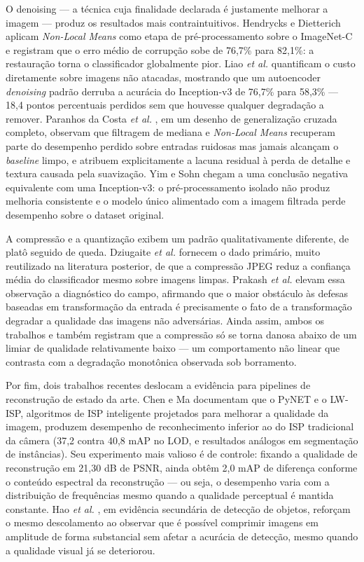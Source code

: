 \documentclass[conference]{IEEEtran}
\begin{document}
O denoising --- a técnica cuja finalidade declarada é justamente melhorar a
imagem --- produz os resultados mais contraintuitivos. Hendrycks e Dietterich
\cite{b6} aplicam \textit{Non-Local Means} como etapa de pré-processamento
sobre o ImageNet-C e registram que o erro médio de corrupção sobe de 76,7\%
para 82,1\%: a restauração torna o classificador globalmente pior. Liao
\textit{et al.} \cite{b7} quantificam o custo diretamente sobre imagens não
atacadas, mostrando que um autoencoder \textit{denoising} padrão derruba a
acurácia do Inception-v3 de 76,7\% para 58,3\% --- 18,4 pontos percentuais
perdidos sem que houvesse qualquer degradação a remover. Paranhos da Costa
\textit{et al.} \cite{b8}, em um desenho de generalização cruzada completo,
observam que filtragem de mediana e \textit{Non-Local Means} recuperam parte do
desempenho perdido sobre entradas ruidosas mas jamais alcançam o \textit{baseline}
limpo, e atribuem explicitamente a lacuna residual à perda de detalhe e textura
causada pela suavização. Yim e Sohn \cite{b9} chegam a uma conclusão negativa
equivalente com uma Inception-v3: o pré-processamento isolado não produz
melhoria consistente e o modelo único alimentado com a imagem filtrada perde
desempenho sobre o dataset original.

A compressão e a quantização exibem um padrão qualitativamente diferente, de
platô seguido de queda. Dziugaite \textit{et al.} \cite{b10} fornecem o dado
primário, muito reutilizado na literatura posterior, de que a compressão JPEG
reduz a confiança média do classificador mesmo sobre imagens limpas. Prakash
\textit{et al.} \cite{b11} elevam essa observação a diagnóstico do campo,
afirmando que o maior obstáculo às defesas baseadas em transformação da entrada
é precisamente o fato de a transformação degradar a qualidade das imagens não
adversárias. Ainda assim, ambos os trabalhos e também \cite{b1} registram que a
compressão só se torna danosa abaixo de um limiar de qualidade relativamente
baixo --- um comportamento não linear que contrasta com a degradação monotônica
observada sob borramento.

Por fim, dois trabalhos recentes deslocam a evidência para pipelines de
reconstrução de estado da arte. Chen e Ma \cite{b12} documentam que o PyNET e o
LW-ISP, algoritmos de ISP inteligente projetados para melhorar a qualidade da
imagem, produzem desempenho de reconhecimento inferior ao do ISP tradicional da
câmera (37,2 contra 40,8 mAP no LOD, e resultados análogos em segmentação de
instâncias). Seu experimento mais valioso é de controle: fixando a qualidade de
reconstrução em 21,30 dB de PSNR, ainda obtêm 2,0 mAP de diferença conforme o
conteúdo espectral da reconstrução --- ou seja, o desempenho varia com a
distribuição de frequências mesmo quando a qualidade perceptual é mantida
constante. Hao \textit{et al.} \cite{b13}, em evidência secundária de detecção
de objetos, reforçam o mesmo descolamento ao observar que é possível comprimir
imagens em amplitude de forma substancial sem afetar a acurácia de detecção,
mesmo quando a qualidade visual já se deteriorou.
\end{document}
